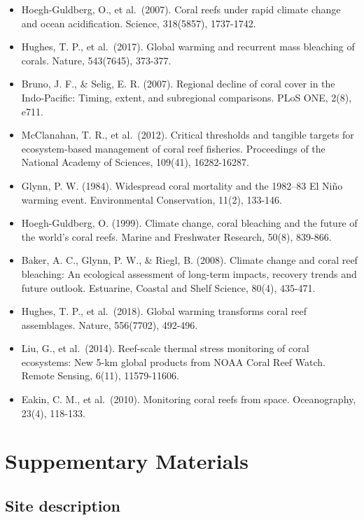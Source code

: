 \documentclass[
  letterpaper,
  DIV=11,
  numbers=noendperiod]{scrartcl}
\providecommand{\tightlist}{%
  \setlength{\itemsep}{0pt}\setlength{\parskip}{0pt}}\usepackage{longtable,booktabs,array}
\begin{document}
\begin{itemize}
\tightlist
\item
  Hoegh-Guldberg, O., et al.~(2007). Coral reefs under rapid climate
  change and ocean acidification. Science, 318(5857), 1737-1742.
\item
  Hughes, T. P., et al.~(2017). Global warming and recurrent mass
  bleaching of corals. Nature, 543(7645), 373-377.
\item
  Bruno, J. F., \& Selig, E. R. (2007). Regional decline of coral cover
  in the Indo-Pacific: Timing, extent, and subregional comparisons. PLoS
  ONE, 2(8), e711.
\item
  McClanahan, T. R., et al.~(2012). Critical thresholds and tangible
  targets for ecosystem-based management of coral reef fisheries.
  Proceedings of the National Academy of Sciences, 109(41), 16282-16287.
\item
  Glynn, P. W. (1984). Widespread coral mortality and the 1982--83 El
  Niño warming event. Environmental Conservation, 11(2), 133-146.
\item
  Hoegh-Guldberg, O. (1999). Climate change, coral bleaching and the
  future of the world's coral reefs. Marine and Freshwater Research,
  50(8), 839-866.
\item
  Baker, A. C., Glynn, P. W., \& Riegl, B. (2008). Climate change and
  coral reef bleaching: An ecological assessment of long-term impacts,
  recovery trends and future outlook. Estuarine, Coastal and Shelf
  Science, 80(4), 435-471.
\item
  Hughes, T. P., et al.~(2018). Global warming transforms coral reef
  assemblages. Nature, 556(7702), 492-496.
\item
  Liu, G., et al.~(2014). Reef-scale thermal stress monitoring of coral
  ecosystems: New 5-km global products from NOAA Coral Reef Watch.
  Remote Sensing, 6(11), 11579-11606.
\item
  Eakin, C. M., et al.~(2010). Monitoring coral reefs from space.
  Oceanography, 23(4), 118-133.
\end{itemize}

\pagebreak

\section{Suppementary Materials}\label{suppementary-materials}

\subsection{Site description}\label{site-description}
\end{document}
